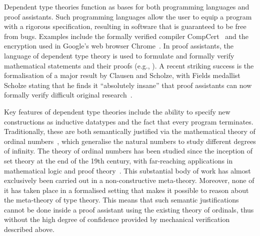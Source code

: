 \documentclass[a4paper,11pt]{article}
\let\oldcite\cite
\renewcommand*\cite[1]{{\protect\NoHyper\oldcite{#1}\protect\endNoHyper}}
\begin{document}
Dependent type theories function as bases for both programming languages and proof assistants.
Such programming
languages allow the user to equip a program with a rigorous specification, resulting in software that is guaranteed to be free from bugs.
Examples include the formally verified compiler CompCert~\cite{Leroy-BKSPF-2016} and the encryption used in Google's web browser Chrome~\cite{erbsen2019simple,MIT:CoqForGoogle}.
%
In proof assistants, the language of dependent type theory is used to formulate and formally verify mathematical statements and their proofs (e.g., \cite{MathematicalComponents,mathlib2020}).
%
A recent striking success is the formalisation of a major result by Clausen and Scholze, with Fields medallist Scholze stating that he finds it %
``absolutely insane'' that proof assistants can now formally verify difficult original research~\cite{scholze:tensor}.
%
%
%

Key features of dependent type theories include the ability to specify new constructions as inductive datatypes and the fact that every program terminates. Traditionally, these are both semantically justified via the mathematical theory of ordinal numbers~\cite{aczelinductive,Floyd:1967},
%
%
which generalise the natural numbers to study different degrees of infinity.
The theory of ordinal numbers has been studied since the inception of set theory at the end of the 19th century, with far-reaching applications in mathematical logic and proof theory~\cite{Rathjen2007}.
This substantial body of work has almost exclusively been carried out in a non-constructive meta-theory.
Moreover, none of it has taken place in a formalised setting that makes it possible to reason about the meta-theory of type theory.
This means that such semantic justifications cannot be done inside a proof assistant using the existing theory of ordinals, thus without the high degree of confidence provided by mechanical verification described above.
\end{document}
